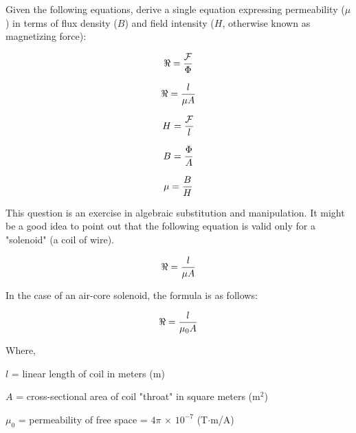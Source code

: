 

Given the following equations, derive a single equation expressing permeability ($\mu$) in terms of flux density ($B$) and field intensity ($H$, otherwise known as magnetizing force):

$$\Re = {{\cal F} \over \Phi}$$

$$\Re = {l \over \mu A}$$

$$H = {{\cal F} \over l}$$

$$B = {\Phi \over A}$$







$$\mu = {B \over H}$$







This question is an exercise in algebraic substitution and manipulation.  It might be a good idea to point out that the following equation is valid only for a "solenoid" (a coil of wire).

$$\Re = {l \over \mu A}$$

In the case of an air-core solenoid, the formula is as follows:

$$\Re = {l \over {\mu_0 A}}$$

\noindent
Where,

$l$ = linear length of coil in meters (m)

$A$ = cross-sectional area of coil "throat" in square meters (m$^{2}$)

$\mu_0$ = permeability of free space = $4 \pi$ $\times$ $10^{-7}$ (T$\cdot$m/A)

\vskip 10pt




